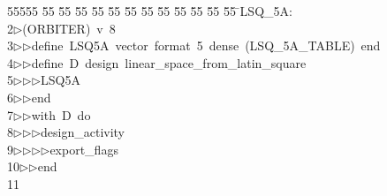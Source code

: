 %
%
\begin{tabbing}
55555 \= 55 \= 55 \= 55 \= 55 \= 55 \= 55 \= 55 \= 55 \= 55 \= 55 \= 55 \= 55 \= \>LSQ\_5A:\\[0pt]
2\>$\triangleright$\>(ORBITER)\ v\ 8\ \\[0pt]
3\>$\triangleright$\>$\triangleright$\>define\ LSQ5A\ vector\ format\ 5\ dense\ (LSQ\_5A\_TABLE)\ end\ \\[0pt]
4\>$\triangleright$\>$\triangleright$\>define\ D\ design\ linear\_space\_from\_latin\_square\ \\[0pt]
5\>$\triangleright$\>$\triangleright$\>$\triangleright$\>LSQ5A\ \\[0pt]
6\>$\triangleright$\>$\triangleright$\>end\ \\[0pt]
7\>$\triangleright$\>$\triangleright$\>with\ D\ do\ \\[0pt]
8\>$\triangleright$\>$\triangleright$\>$\triangleright$\>design\_activity\ \\[0pt]
9\>$\triangleright$\>$\triangleright$\>$\triangleright$\>$\triangleright$\>export\_flags\ \\[0pt]
10\>$\triangleright$\>$\triangleright$\>end\\[0pt]
11\>\end{tabbing}
